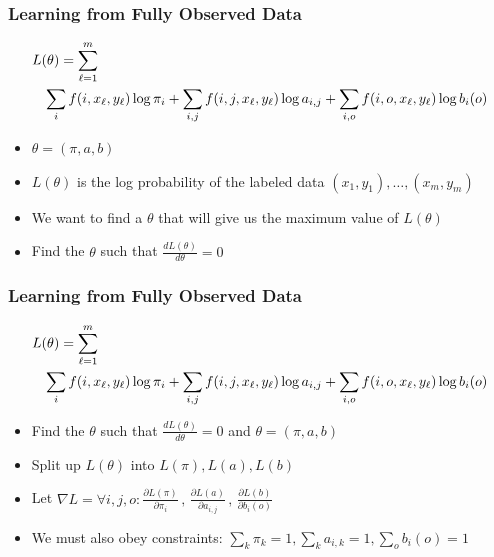 \begin{frame}
\frametitle{Learning from Fully Observed Data}
{\small\begin{eqnarray*}
\lefteqn{L(\theta) = \sum_{\ell=1}^m  } \\
&& \sum_{i} f(i,x_\ell,y_\ell) \log \pi_i + \sum_{i,j} f(i,j,x_\ell,y_\ell) \log a_{i,j} + \sum_{i,o} f(i,o,x_\ell,y_\ell) \log b_i(o) \end{eqnarray*}}
\begin{itemize}[<+->]
\item $\theta = \left( \pi, a, b \right)$
\item $L(\theta)$ is the log probability of the labeled data $(x_1, y_1), \ldots, (x_m, y_m)$ 
\item We want to find a $\theta$ that will give us the maximum value of $L(\theta)$
\item Find the $\theta$ such that $\frac{d L(\theta)}{d \theta} = 0$ 
\end{itemize}
\end{frame}

\begin{frame}
\frametitle{Learning from Fully Observed Data}
{\small\begin{eqnarray*}
\lefteqn{L(\theta) = \sum_{\ell=1}^m  } \\
&& \sum_i f(i,x_\ell,y_\ell) \log \pi_i + \sum_{i,j} f(i,j,x_\ell,y_\ell) \log a_{i,j} + \sum_{i,o} f(i,o,x_\ell,y_\ell) \log b_i(o) \end{eqnarray*}}
\begin{itemize}[<+->]
\item Find the $\theta$ such that $\frac{d L(\theta)}{d \theta} = 0$ and $\theta = \left( \pi, a, b \right)$
\item Split up $L(\theta)$ into $L(\pi), L(a), L(b)$
\item Let $\nabla L = \forall i,j,o: \frac{\partial L(\pi)}{\partial \pi_i} \, , \, \frac{\partial L(a)}{\partial a_{i,j}} \, , \, \frac{\partial L(b)}{\partial b_i(o)}$
\item We must also obey constraints: $\sum_k \pi_k = 1, \sum_k a_{i,k} = 1, \sum_o b_i(o) = 1$
\end{itemize}
\end{frame}

